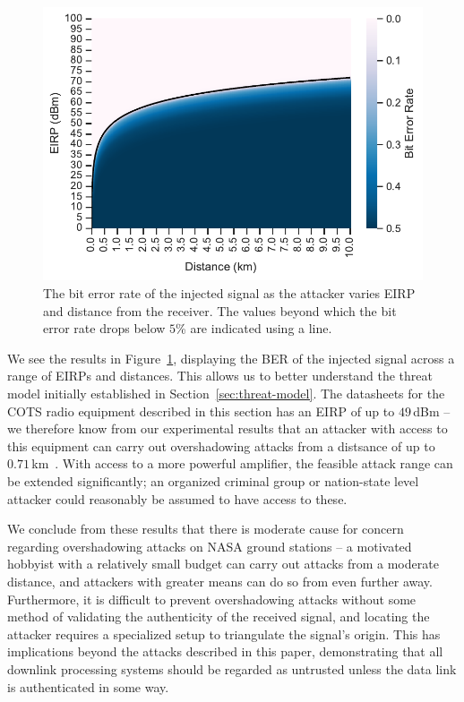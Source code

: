 \begin{figure}
    \centering
    \includegraphics[width=\columnwidth]{diagrams/distance_eirp_heatmap_95.pdf}
    \caption{The bit error rate of the injected signal as the attacker varies EIRP and distance from the receiver. The values beyond which the bit error rate drops below $5$\% are indicated using a line.}
    \label{fig:distance_eirp}
\end{figure}

We see the results in Figure~\ref{fig:distance_eirp}, displaying the BER of the injected signal across a range of EIRPs and distances.
This allows us to better understand the threat model initially established in Section~\ref{sec:threat-model}.
The datasheets for the COTS radio equipment described in this section has an EIRP of up to $49$\,dBm -- we therefore know from our experimental results that an attacker with access to this equipment can carry out overshadowing attacks from a distsance of up to $0.71$\,km~\cite{endurosat:xbandtransmitter,endurosat:xbandantenna}.
With access to a more powerful amplifier, the feasible attack range can be extended significantly; an organized criminal group or nation-state level attacker could reasonably be assumed to have access to these.

We conclude from these results that there is moderate cause for concern regarding overshadowing attacks on NASA ground stations -- a motivated hobbyist with a relatively small budget can carry out attacks from a moderate distance, and attackers with greater means can do so from even further away.
Furthermore, it is difficult to prevent overshadowing attacks without some method of validating the authenticity of the received signal, and locating the attacker requires a specialized setup to triangulate the signal's origin.
This has implications beyond the attacks described in this paper, demonstrating that all downlink processing systems should be regarded as untrusted unless the data link is authenticated in some way.
